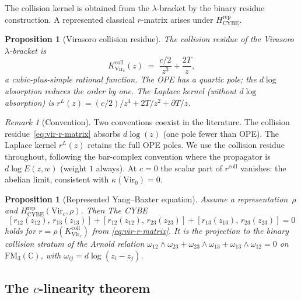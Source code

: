 \documentclass[11pt,reqno]{amsart}
\newtheorem{proposition}[theorem]{Proposition}
\theoremstyle{definition}
\theoremstyle{remark}
\newtheorem{remark}[theorem]{Remark}
\providecommand{\Vir}{\mathrm{Vir}}
\begin{document}
The collision kernel is obtained from the $\lambda$-bracket by the
binary residue construction.  A represented classical $r$-matrix
arises under $H_{\mathrm{CYBE}}^{\mathrm{rep}}$.

\begin{proposition}[Virasoro collision residue]
\label{prop:vir-r-matrix}
The collision residue of the Virasoro\/ $\lambda$-bracket is
\begin{equation}\label{eq:vir-r-matrix}
K_{\Vir_c}^{\mathrm{coll}}(z) \;=\;
\frac{c/2}{z^3} + \frac{2T}{z},
\end{equation}
a cubic-plus-simple rational function. The OPE has a quartic pole;
the $d\log$ absorption reduces the order by one. The Laplace kernel
(without $d\log$ absorption) is $r^L(z)
= (c/2)/z^4 + 2T/z^2 + \partial T/z$.
\end{proposition}

\begin{remark}[Convention]
\label{rem:r-matrix-convention}
Two conventions coexist in the literature. The collision
residue~\eqref{eq:vir-r-matrix} absorbs $d\log(z)$ (one pole fewer
than OPE). The Laplace kernel $r^L(z)$ retains the full OPE poles.
We use the collision residue throughout, following the bar-complex
convention where the propagator is $d\log E(z,w)$ (weight $1$
always). At $c = 0$ the scalar part of
$r^{\mathrm{coll}}$ vanishes: the abelian limit, consistent with
$\kappa(\mathrm{Vir}_0) = 0$.
\end{remark}

\begin{proposition}[Represented Yang--Baxter equation]
\label{prop:vir-ybe}
Assume a representation~$\rho$ and
$H_{\mathrm{CYBE}}^{\mathrm{rep}}(\Vir_c,\rho)$.  Then
The CYBE
\begin{equation}\label{eq:vir-cybe}
[r_{12}(z_{12}),\, r_{13}(z_{13})]
+ [r_{12}(z_{12}),\, r_{23}(z_{23})]
+ [r_{13}(z_{13}),\, r_{23}(z_{23})]
= 0
\end{equation}
holds for $r=\rho(K_{\Vir_c}^{\mathrm{coll}})$ from
\eqref{eq:vir-r-matrix}. It is the
projection to the binary collision stratum of the Arnold relation
$\omega_{12} \wedge \omega_{23} + \omega_{23} \wedge \omega_{13}
+ \omega_{13} \wedge \omega_{12} = 0$ on\/
$\mathrm{FM}_3(\mathbb{C})$, with\/
$\omega_{ij} = d\log(z_i - z_j)$.
\end{proposition}

\subsection{The $c$-linearity theorem}
\end{document}
